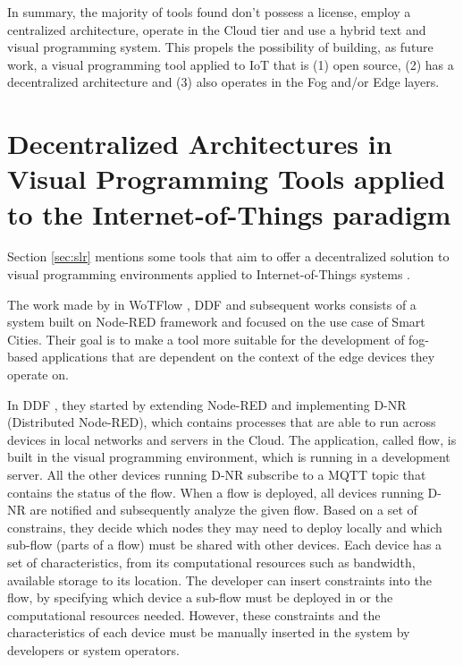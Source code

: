 In summary, the majority of tools found don't possess a license, employ a centralized architecture, operate in the Cloud tier and use a hybrid text and visual programming system. This propels the possibility of building, as future work, a visual programming tool applied to IoT that is (1) open source, (2) has a decentralized architecture and (3) also operates in the Fog and/or Edge layers.

\section{Decentralized Architectures in Visual Programming Tools applied to the Internet-of-Things paradigm}\label{sec:sota_decentralized}


Section \ref{sec:slr} mentions some tools that aim to offer a decentralized solution to visual programming environments applied to Internet-of-Things systems \cite{ddf} \cite{ddflow} \cite{wotflow_dnr}.

The work made by in WoTFlow \cite{wotflow_dnr}, DDF \cite{ddf} and subsequent works \cite{fog_at_the_edge} \cite{exogenous_coordination} consists of a system built on Node-RED framework and focused on the use case of Smart Cities. Their goal is to make a tool more suitable for the development of fog-based applications that are dependent on the context of the edge devices they operate on. 

In DDF \cite{ddf}, they started by extending Node-RED and implementing D-NR (Distributed Node-RED), which contains processes that are able to run across devices in local networks and servers in the Cloud. The application, called flow, is built in the visual programming environment, which is running in a development server. All the other devices running D-NR subscribe to a MQTT topic that contains the status of the flow. When a flow is deployed, all devices running D-NR are notified and subsequently analyze the given flow. Based on a set of constrains, they decide which nodes they may need to deploy locally and which sub-flow (parts of a flow) must be shared with other devices. Each device has a set of characteristics, from its computational resources such as bandwidth, available storage to its location. The developer can insert constraints into the flow, by specifying which device a sub-flow must be deployed in or the computational resources needed. However, these constraints and the characteristics of each device must be manually inserted in the system by developers or system operators. 

